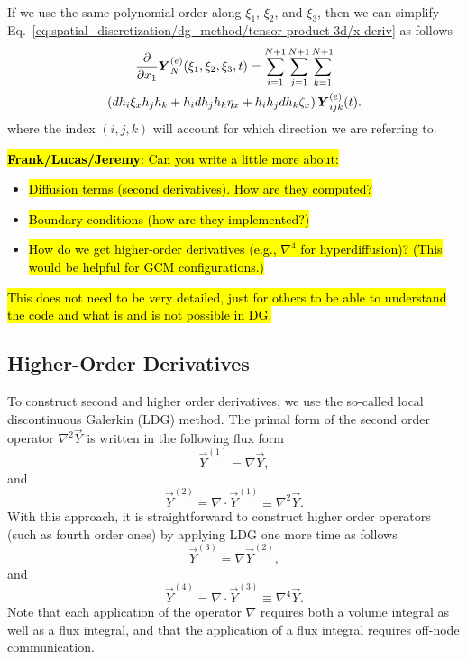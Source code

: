 \documentclass{report}
\begin{document}
{\begin{multline}
\label{eq:spatial_discretization/dg_method/tensor-product-3d/x-deriv}
\end{multline}
If we use the same polynomial order along $\xi_{1}$, $\xi_{2}$, and $\xi_{3}$, then we can simplify Eq.\ \eqref{eq:spatial_discretization/dg_method/tensor-product-3d/x-deriv} as follows
\begin{multline}
\frac{\partial }{\partial x_{1}} \boldsymbol{{Y}}^{(e)}_N(\xi_{1}, \xi_{2}, \xi_{3}, t) = \sum_{i=1}^{N+1} \sum_{j=1}^{N+1} \sum_{k=1}^{N+1} \\
\left( dh_i \xi_x h_j h_k + h_i dh_j h_k \eta_x + h_i h_j dh_k \zeta_x\right) \boldsymbol{{Y}}^{(e)}_{ijk}(t).
\label{eq:spatial_discretization/dg_method/tensor-product-3d/x-deriv2}
\end{multline}
where the index $(i,j,k)$ will account for which direction we are referring to.

\hl{\textbf{Frank/Lucas/Jeremy}: Can you write a little more about:}
\begin{itemize}
    \item \hl{Diffusion terms (second derivatives). How are they computed?}
    \item \hl{Boundary conditions (how are they implemented?)}
    \item \hl{How do we get higher-order derivatives (e.g., $\nabla^4$ for hyperdiffusion)? (This would be helpful for GCM configurations.)}
\end{itemize}
\hl{This does not need to be very detailed, just for others to be able to understand the code and what is and is not possible in DG.}

\subsection{Higher-Order Derivatives}
To construct second and higher order derivatives,  we use the so-called local discontinuous Galerkin (LDG) method.  The primal form of the second order operator $\nabla^2 \vec{Y}$ is written in the following flux form
\[
\vec{Y}^{(1)} = \nabla \vec{Y},
\]
and
\[
\vec{Y}^{(2)} = \nabla \cdot \vec{Y}^{(1)} \equiv \nabla^2 \vec{Y}.
\]
With this approach, it is straightforward to construct higher order operators (such as fourth order ones) by applying LDG one more time as follows
\[
\vec{Y}^{(3)} = \nabla \vec{Y}^{(2)},
\]
and
\[
\vec{Y}^{(4)} = \nabla \cdot \vec{Y}^{(3)} \equiv \nabla^4 \vec{Y}.
\]
Note that each application of the operator $\nabla$ requires both a volume integral as well as a flux integral, and that the application of a flux integral requires off-node communication.

}
\end{document}
